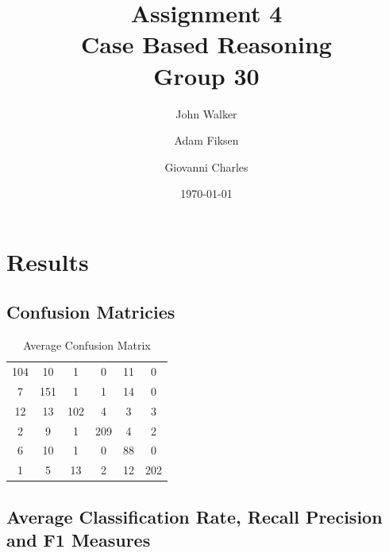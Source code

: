 \documentclass[11pt]{article}
\begin{document}
\title{Assignment 4\\ Case Based Reasoning \\ Group 30  }

\author{John Walker \and Adam Fiksen \and Giovanni Charles }

\date{\today}         %

\maketitle           %


\section{Results}

\subsection{Confusion Matricies}

\begin{table}[H]
\caption{Average Confusion Matrix} %
\centering %
\begin{tabular}{c c c c c c} %
\hline %
104  & 10    & 1     & 0     & 11  & 0   \\ %
7    & 151   & 1     & 1     & 14  & 0   \\
12   & 13    & 102   & 4     & 3   & 3   \\
2    & 9     & 1     & 209   & 4   & 2   \\
6    & 10    & 1     & 0     & 88  & 0   \\ 
1    & 5     & 13    & 2     & 12  & 202 \\ [1ex] %
\hline %
\end{tabular}
\label{table:conf} %
\end{table}


\subsection{Average Classification Rate, Recall Precision and F1 Measures}
\end{document}
